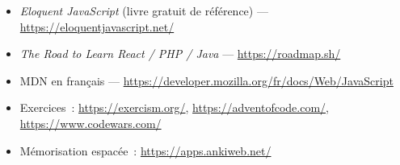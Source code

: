 \documentclass[12pt,a4paper,twoside,openright]{book}
\begin{document}
\begin{ressources}
\begin{itemize}
  \item \emph{Eloquent JavaScript} (livre gratuit de r\'ef\'erence) --- \url{https://eloquentjavascript.net/}
  \item \emph{The Road to Learn React / PHP / Java} --- \url{https://roadmap.sh/}
  \item MDN en fran\c{c}ais --- \url{https://developer.mozilla.org/fr/docs/Web/JavaScript}
  \item Exercices~: \url{https://exercism.org/}, \url{https://adventofcode.com/}, \url{https://www.codewars.com/}
  \item M\'emorisation espac\'ee~: \url{https://apps.ankiweb.net/}
\end{itemize}
\end{ressources}

\end{document}
